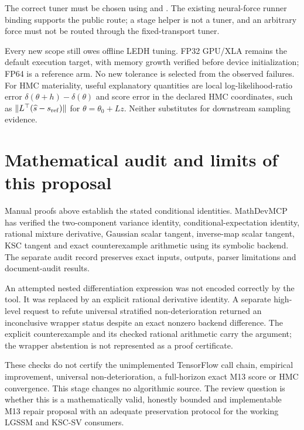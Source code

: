 \documentclass[11pt]{article}
\begin{document}
The correct tuner must be chosen using
 and
.
The existing neural-force runner binding supports the public
 route; a stage helper is not a tuner, and an
arbitrary force must not be routed through the fixed-transport tuner.

Every new scope still owes offline LEDH tuning. FP32 GPU/XLA remains the
default execution target, with memory growth verified before device
initialization; FP64 is a reference arm. No new tolerance is selected from
the observed failures. For HMC materiality, useful explanatory quantities
are local log-likelihood-ratio error
$\delta(\theta+h)-\delta(\theta)$ and score error in the declared HMC
coordinates, such as $\|L^\top(\widehat s-s_{\rm ref})\|$ for
$\theta=\theta_0+Lz$. Neither substitutes for downstream sampling evidence.

\section{Mathematical audit and limits of this proposal}

Manual proofs above establish the stated conditional identities. MathDevMCP
has verified the two-component variance identity, conditional-expectation
identity, rational mixture derivative, Gaussian scalar tangent,
inverse-map scalar tangent, KSC tangent and exact counterexample arithmetic
using its symbolic backend. The separate audit record preserves exact
inputs, outputs, parser limitations and document-audit results.

An attempted nested differentiation expression was not encoded correctly by
the tool. It was replaced by an explicit rational derivative identity.
A separate high-level request to refute universal stratified
non-deterioration returned an inconclusive wrapper status despite an
exact nonzero backend difference. The explicit counterexample and its
checked rational arithmetic carry the argument; the wrapper abstention
is not represented as a proof certificate.

These checks do not certify the unimplemented TensorFlow call chain,
empirical improvement, universal non-deterioration, a full-horizon exact
M13 score or HMC convergence. This stage changes no algorithmic source.
The review question is whether this is a mathematically valid, honestly
bounded and implementable M13 repair proposal with an adequate preservation
protocol for the working LGSSM and KSC-SV consumers.
\end{document}
